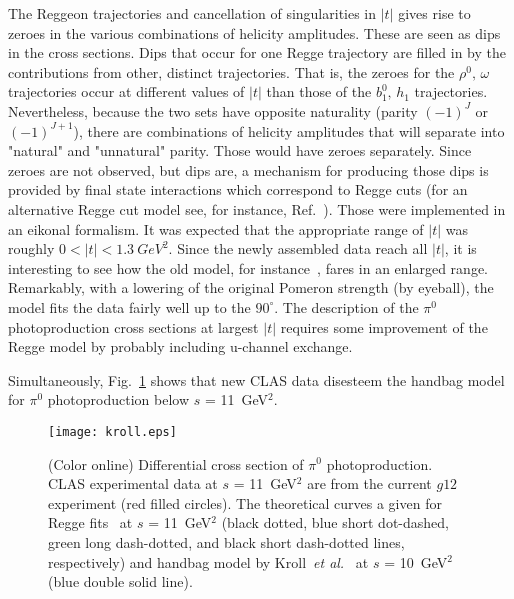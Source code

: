 \documentclass[aps,prc,onecolumn,floatfix,showpacs,preprintnumbers,amsmath,amssymb,superscriptaddress]{revtex4-1}
\begin{document}
The Reggeon trajectories and cancellation of singularities in $|t|$ 
gives rise to zeroes in the various combinations of helicity 
amplitudes. These are seen as dips in the cross sections. Dips that 
occur for one Regge trajectory are filled in by the contributions 
from other, distinct trajectories. That is, the zeroes for the 
$\rho^0, \, \omega$ trajectories occur at different values of $|t|$ 
than those of the $b_1^0, \, h_1$ trajectories. Nevertheless, 
because the two sets have opposite naturality (parity $(-1)^J$ or 
$(-1)^{J+1}$), there are combinations of helicity amplitudes that 
will separate into "natural" and "unnatural" parity.  Those would 
have zeroes separately. Since zeroes are not observed, but dips 
are, a mechanism for producing those dips is provided by final 
state interactions which correspond to Regge cuts (for an 
alternative Regge cut model see, for instance, Ref.~\cite{Laget}). 
Those were implemented in an eikonal formalism. It was expected 
that the appropriate range of $|t|$ was roughly $0 < |t| < 
1.3~GeV^2$. Since the newly assembled data reach all $|t|$, it is 
interesting to see how the old model, for instance~\cite{Goldstein}, 
fares in an enlarged range. Remarkably, with a lowering of the 
original Pomeron strength (by eyeball), the model fits the data 
fairly well up to the $90^\circ$.  The description of the $\pi^0$ 
photoproduction cross sections at largest $|t|$ requires some
improvement of the Regge model by probably including u-channel 
exchange.

Simultaneously, Fig.~\ref{fig:kroll} shows that new CLAS data 
disesteem the handbag model for $\pi^0$ photoproduction below 
$s$ = 11~GeV$^2$.

\begin{figure}[htb!]
\centerline{
        \texttt{[image: kroll.eps]}}

        \caption {(Color online) Differential cross section 
		of $\pi^0$ photoproduction. CLAS experimental 
		data at $s$ = 11~GeV$^2$ are from the 
		current $g12$ experiment (red filled circles).  
		The theoretical curves a given for Regge 
		fits~\protect\cite{Goldstein,Laget,Mathieu,
                Donnachie} at $s$ = 11~GeV$^2$ (black dotted, 
		blue short dot-dashed, green long dash-dotted, 
		and black short dash-dotted lines, 
		respectively) and handbag model by 
		Kroll~\protect\textit{et 
		al.}~\protect\cite{Kroll} at $s$ = 10~GeV$^2$ 
		(blue double solid line).} 
		\label{fig:kroll}
\end{figure}
\end{document}
